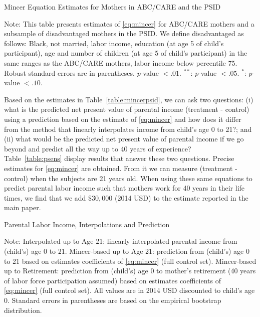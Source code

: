 \begin{table}[H]
\begin{threeparttable}
\caption{Mincer Equation Estimates for Mothers in ABC/CARE and the PSID}
\label{table:mincerpsid}
\centering
\footnotesize

\begin{tablenotes}
\footnotesize
\item Note: This table presents estimates of \eqref{eq:mincer} for ABC/CARE mothers and a subsample of disadvantaged mothers in the PSID. We define disadvantaged as follows: Black, not married, labor income, education (at age 5 of child's participant), age and number of children (at age 5 of child's participant) in the same ranges as the ABC/CARE mothers, labor income below percentile 75. Robust standard errors are in parentheses. $p$-value $< .01$. $^{**}$: $p$-value $< .05$. $^{*}$: $p$-value $< .10$.
\end{tablenotes}
\end{threeparttable}
\end{table}

\noindent Based on the estimates in Table~\ref{table:mincerpsid}, we can ask two questions: (i) what is the predicted net present value of parental income (treatment - control) using a prediction based on the estimate of \eqref{eq:mincer} and how does it differ from the method that linearly interpolates income from child's age 0 to 21?; and (ii) what would be the predicted net present value of parental income if we go beyond and predict all the way up to 40 years of experience?\\

\noindent Table~\ref{table:psens} display results that answer these two questions. Precise estimates for \eqref{eq:mincer} are obtained. From it we can measure (treatment - control) when the subjects are 21 years old. When using these same equations to predict parental labor income such that mothers work for 40 years in their life times, we find that we add $\$30,000$ (2014 USD) to the estimate reported in the main paper.

\begin{table}[H]
\begin{threeparttable}
\caption{Parental Labor Income, Interpolations and Prediction}
\label{table:psens}
\centering

\begin{tablenotes}
\footnotesize
\item Note:  Interpolated up to Age 21: linearly interpolated parental income from (child's) age 0 to 21. Mincer-based up to Age 21: prediction from (child's) age 0 to 21 based on estimates coefficients of \eqref{eq:mincer} (full control set). Mincer-based up to Retirement: prediction from (child's) age 0 to mother's retirement (40 years of labor force participation assumed) based on estimates coefficients of \eqref{eq:mincer} (full control set). All values are in 2014 USD discounted to child's age 0. Standard errors in parentheses are based on the empirical bootstrap distribution.
\end{tablenotes}
\end{threeparttable}
\end{table}

